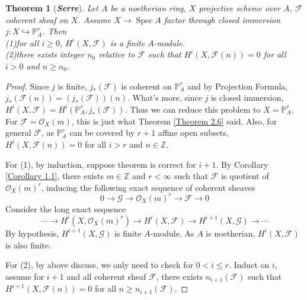 \documentclass{ctexart}
\newtheorem{theorem}{Theorem}[section]
\newcommand{\spec}{\operatorname{Spec}}
\begin{document}
\begin{theorem}[\textbf{\emph{Serre}}]
    Let $A$ be a noetherian ring, $X$ projective scheme over $A$, $\mathcal{F}$ coherent sheaf on $X$.
    Assume $X \rightarrow \spec A$ factor through closed immersion $j: X \hookrightarrow \mathbb{P}_{A}^{r}$.
    Then \\
    (1)for all $i \ge 0$, $H^{i}(X, \mathcal{F})$ is a finite $A$-module. \\
    (2)there exists integer $n_{0}$ relative to $\mathcal{F}$ such that $H^{i}(X, \mathcal{F}(n)) = 0$ for all $i > 0$ and $n \ge n_{0}$.
    \label{Theorem 2.7}
\end{theorem}
\begin{proof}
    Since $j$ is finite, $j_{\ast}(\mathcal{F})$ is coherent on $\mathbb{P}_{A}^{r}$ and by Projection Formula, $j_{\ast}(\mathcal{F}(n)) = (j_{\ast}(\mathcal{F}))(n)$.
    What's more, since $j$ is closed immersion, $H^{i}(X, \mathcal{F}) = H^{i}(\mathbb{P}_{A}^{r}, j_{\ast}(\mathcal{F}))$.
    Thus we can reduce this problem to $X = \mathbb{P}_{A}^{r}$.
    For $\mathcal{F} = \mathcal{O}_{X}(m)$, this is just what Theorem \ref{Theorem 2.6} said.
    Also, for general $\mathcal{F}$, as $\mathbb{P}_{A}^{r}$ can be covered by $r + 1$ affine open subsets, 
    $H^{i}(X, \mathcal{F}(n)) = 0$ for all $i > r$ and $n\in \mathbb{Z}$.
    \par
    For (1), by induction, suppose theorem is correct for $i + 1$.
    By Corollary \ref{Corollary 1.1}, there exists $m\in \mathbb{Z}$ and $r < \infty$ such that $\mathcal{F}$ is quotient of $\mathcal{O}_{X}(m)^{r}$,
    inducing the following exact sequence of coherent sheaves
    \begin{equation}
        0 \longrightarrow \mathcal{G} \longrightarrow \mathcal{O}_{X}(m)^{r} \longrightarrow \mathcal{F} \longrightarrow 0
    \end{equation} 
    Consider the long exact sequence
    \begin{equation}
        \cdots \longrightarrow H^{i}(X, \mathcal{O}_{X}(m)^{r}) \longrightarrow H^{i}(X, \mathcal{F}) \longrightarrow H^{i + 1}(X, \mathcal{G}) \longrightarrow \cdots
    \end{equation}
    By hypothesis, $H^{i + 1}(X, \mathcal{G})$ is finite $A$-module.
    As $A$ is noetherian, $H^{i}(X, \mathcal{F})$ is also finite.
    \par
    For (2), by above discuss, we only need to check for $0 < i \le r$.
    Induct on $i$, assume for $i + 1$ and all coherent sheaf $\mathcal{F}$,
    there exists $n_{i + 1}(\mathcal{F})$ such that $H^{i + 1}(X, \mathcal{F}(n)) = 0$ for all $n \ge n_{i + 1}(\mathcal{F})$.

\end{proof}
\end{document}
